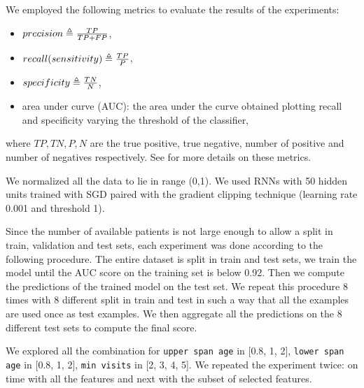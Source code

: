 We employed the following metrics to evaluate the results of the experiments:
\begin{itemize}
	\item $precision \triangleq \frac{TP}{TP+FP}$,
	\item $recall(sensitivity) \triangleq \frac{TP}{P}$,
	\item $specificity \triangleq 	\frac{TN}{N}$,
	\item area under curve (AUC): the area under the curve obtained plotting recall and specificity varying the threshold of the classifier,
\end{itemize}
where $TP, TN, P, N$ are the true positive, true negative, number of positive and number of negatives respectively. See \cite{RocMetrics} for more details on these metrics.

We normalized all the data to lie in range (0,1). 
We used RNNs with 50 hidden units trained with SGD paired with the gradient clipping technique (learning rate 0.001 and threshold 1).

Since the number of available patients is not large enough to allow a split in train, validation and test sets, each experiment was done according to the following procedure. The entire dataset is split in train and test sets, we train the model until the
AUC score on the training set is below 0.92. Then we compute the predictions of the trained model on the test set. We repeat this procedure 8 times with 8 different split in train and test in such a way that all the examples are used once as test examples. We then aggregate all the predictions on the 8 different test sets to compute the final score.
 
We explored all the combination for \texttt{upper span age} in [0.8, 1, 2], \texttt{lower span age} in [0.8, 1, 2], \texttt{min visits} in [2, 3, 4, 5].  We repeated the experiment twice: on time with all the features and next with the subset of selected features.



